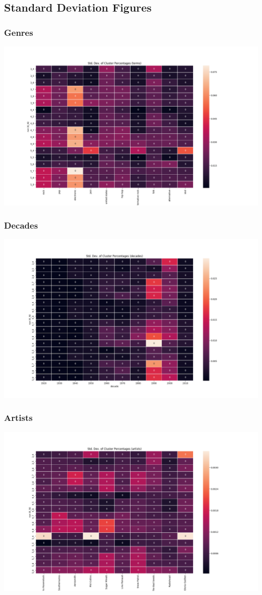 \subsection{Standard Deviation Figures}
    \subsubsection{Genres}
        \includegraphics[width=1.2\textwidth]{sd_terms}
    \subsubsection{Decades}
        \includegraphics[width=1.2\textwidth]{sd_decades}
    \subsubsection{Artists}
        \includegraphics[width=1.2\textwidth]{sd_artists}

